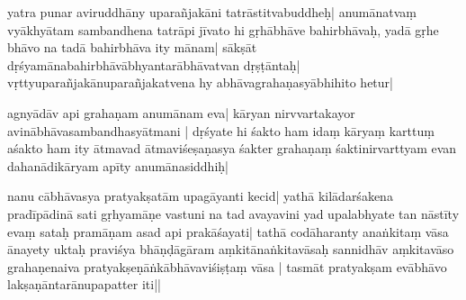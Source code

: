 ya\mms tra punar aviruddhāny upara\mme ñjakāni tatrāstitvabuddheḥ|
anumānatvaṃ vyākhyātam
sambandhena tatrāpi jīvato hi %
gṛhābhāve bahirbhāvaḥ, yadā gṛhe bhāvo na tadā bahirbhāva \mms ity
mānam| sā\mme kṣāt dṛśyamānabahirbhāvābhyantarābhāvatvan dṛṣṭāntaḥ| %
vṛttyuparañjakānuparañjakatvena hy abhāvagrahaṇasyābhihito hetur| %

agny\mms ādāv api grahaṇam anumānam eva|
kāryan nirvva\mms rtakayor avinābhāvasambandhasyātmani
| dṛśyate hi
%
śakto ham idaṃ kāryaṃ karttuṃ aśakto ham ity ātmavad ātmaviśeṣaṇa\mms sya śakter grahaṇaṃ śaktinirva\mme rttyam evan dahanādikārya\mms m apīty anumānasiddhiḥ| %

nanu cābhāvasya pratyakṣatām upagāyanti kecid| yathā kilādarśakena pradīpādi\mme nā sati gṛhyamāṇe vastuni na tad avayavini yad upa\mms labhyate tan nāstīty evaṃ sataḥ %
pra\mme māṇam asad api prakā\mms śayati| %
tathā codāharanty anaṅkitaṃ vāsa ānayety uktaḥ praviśya bhāṇḍāgāram aṃkitānaṅkitavāsaḥ sanni\mme dhāv aṃkitavāso grahaṇenaiva pratyakṣeṇ\mms āṅkābhāvaviśiṣṭaṃ vāsa | tasmāt\mme %
pratyakṣam evābhā\mms vo lakṣaṇāntarānupapatter iti|| %

